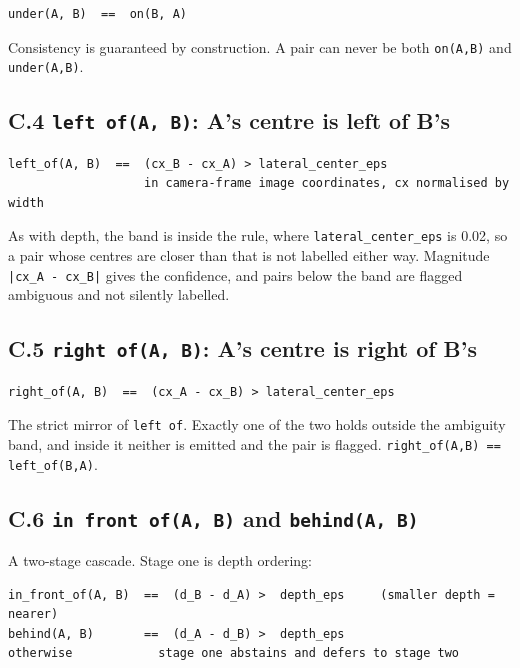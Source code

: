 \begingroup\small\begin{verbatim}
under(A, B)  ==  on(B, A)
\end{verbatim}\endgroup

Consistency is guaranteed by construction. A pair can never be both \texttt{on(A,B)} and \texttt{under(A,B)}.

\subsection{C.4 \texttt{left of(A, B)}: A's centre is left of B's}

\begingroup\small\begin{verbatim}
left_of(A, B)  ==  (cx_B - cx_A) > lateral_center_eps
                   in camera-frame image coordinates, cx normalised by width
\end{verbatim}\endgroup

As with depth, the band is inside the rule, where \texttt{lateral\_\allowbreak{}center\_\allowbreak{}eps} is 0.02, so a pair whose centres are closer than that is not labelled either way. Magnitude \texttt{|cx\_\allowbreak{}A - cx\_\allowbreak{}B|} gives the confidence, and pairs below the band are flagged ambiguous and not silently labelled.

\subsection{C.5 \texttt{right of(A, B)}: A's centre is right of B's}

\begingroup\small\begin{verbatim}
right_of(A, B)  ==  (cx_A - cx_B) > lateral_center_eps
\end{verbatim}\endgroup

The strict mirror of \texttt{left of}. Exactly one of the two holds outside the ambiguity band, and inside it neither is emitted and the pair is flagged. \texttt{right\_\allowbreak{}of(A,B) == left\_\allowbreak{}of(B,A)}.

\subsection{C.6 \texttt{in front of(A, B)} and \texttt{behind(A, B)}}

A two-stage cascade. Stage one is depth ordering:

\begingroup\small\begin{verbatim}
in_front_of(A, B)  ==  (d_B - d_A) >  depth_eps     (smaller depth = nearer)
behind(A, B)       ==  (d_A - d_B) >  depth_eps
otherwise            stage one abstains and defers to stage two
\end{verbatim}\endgroup

